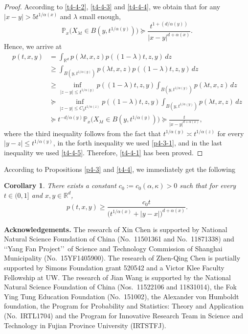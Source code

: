 \documentclass[a4paper,11pt]{amsart}
\renewcommand{\le}{\leqslant}
\renewcommand{\ge}{\geqslant}
\newcommand{\R}{\mathds R}
\newcommand{\Pp}{\mathds P}
\newcommand{\q}{\succeq}
\newcommand{\K}{\kappa}
\newcommand{\A}{\alpha}
\newtheorem{corollary}[theorem]{Corollary}
\theoremstyle{definition}
\begin{document}
\begin{proof}
According to \eqref{t4-4-2}, \eqref{t4-4-3} and \eqref{t4-4-4}, we obtain
that for any $|x-y|>5t^{{1}/{\A(x)}}$ and $\lambda$ small enough,
\begin{equation}\label{t4-4-5}
\Pp_x\big(X_{\lambda t}\in B(y,t^{{1}/{\A(y)}})\big)\q
\frac{t^{1+({d}/{\A(y)})}}{|x-y|^{d+\A(x)}}.
\end{equation}
Hence, we arrive at
\begin{align*}
p(t,x,y)&=\int_{\R^d}p(\lambda t,x,z)p((1-\lambda)t,z,y)\,dz\\
&\ge \int_{B(y,t^{{1}/{\A(y)}})}
p(\lambda t,x,z)p((1-\lambda)t,z,y)\,dz\\
&\ge \inf_{|z-y|\le t^{{1}/{\A(y)}}}p((1-\lambda)t,z,y)
\int_{B(y,t^{{1}/{\A(y)}})}p(\lambda t,x,z)\,dz\\
&\q \inf_{|z-y|\le C_3t^{{1}/{\A(z)}}}p((1-\lambda)t,z,y)
\int_{B(y,t^{{1}/{\A(y)}})}p(\lambda t,x,z)\,dz\\
&\q t^{-{d}/{\A(y)}} \Pp_x\big(X_{\lambda t}\in B(y,t^{{1}/{\A(y)}})\big)\q \frac{t}{|x-y|^{d+\A(x)}},
\end{align*}
where the third inequality follows from the fact that $t^{{1}/{\A(y)}}\asymp t^{{1}/{\A(z)}}$ for every
$|y-z|\le t^{{1}/{\A(y)}}$, in the forth inequality we used \eqref{p4-3-1}, and in the last inequality we used \eqref{t4-4-5}.
Therefore, \eqref{t4-4-1} has been proved.
\end{proof}

According to Propositions \ref{p4-3} and \ref{t4-4}, we immediately get the following

\begin{corollary}\label{c-lower}
There exists a constant
$c_0:=c_0(\A,\K)>0$ such that for every $t\in (0,1]$ and $x,y \in \R^d$,
\begin{equation*}\label{t4-4-1a}
p(t,x,y)\ge
\frac{c_0 t }{\big(t^{{1}/{\A(x)}}+|y-x|\big)^{d+\A(x)}}.
\end{equation*}
\end{corollary}

\bigskip

\noindent \textbf{Acknowledgements.} \small The
research of Xin Chen is supported by National Natural Science Foundation of China (No.\ 11501361 and No.\ 11871338) and \lq\lq Yang Fan Project\rq\rq \, of Science and Technology Commission of Shanghai Municipality (No.\ 15YF1405900).
The research of Zhen-Qing Chen is  partially supported by Simons Foundation grant 520542 and a Victor Klee Faculty Fellowship at UW.
The research of Jian Wang is supported by the National Natural Science Foundation of China (Nos.\ 11522106 and 11831014), the Fok Ying Tung Education Foundation (No.\ 151002), the Alexander von Humboldt foundation, the Program for Probability and Statistics: Theory and Application (No.\ IRTL1704) and the Program for Innovative Research Team in Science and Technology in Fujian Province University (IRTSTFJ).
\end{document}
